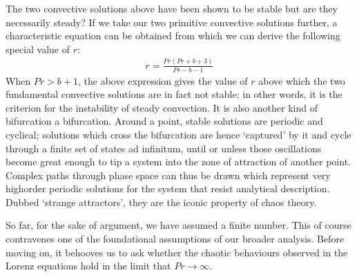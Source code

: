 \documentclass[letterpaper,10pt,english]{jupyterBook}
\begin{document}
\sphinxAtStartPar
The two convective solutions above have been shown to be stable \sphinxhyphen{} but are they necessarily steady? If we take our two primitive convective solutions further, a characteristic equation can be obtained from which we can derive the following special value of \(r\):
\begin{equation*}
\begin{split} r = \frac{Pr \left( Pr + b + 3 \right)}{Pr - b - 1} \end{split}
\end{equation*}
\sphinxAtStartPar
When \(Pr>b+1\), the above expression gives the value of \(r\) above which the two fundamental convective solutions are in fact not stable; in other words, it is the criterion for the instability of steady convection. It is also another kind of bifurcation \sphinxhyphen{} a  bifurcation. Around a  point, stable solutions are periodic and cyclical; solutions which cross the bifurcation are hence ‘captured’ by it and cycle through a finite set of states ad infinitum, until or unless those oscillations become great enough to tip a system into the zone of attraction of another  point. Complex paths through phase space can thus be drawn which represent very high\sphinxhyphen{}order periodic solutions for the system that resist analytical description. Dubbed ‘strange attractors’, they are the iconic property of chaos theory.

\sphinxAtStartPar
So far, for the sake of argument, we have assumed a finite  number. This of course contravenes one of the foundational assumptions of our broader analysis. Before moving on, it behooves us to ask whether the chaotic behaviours observed in the Lorenz equations hold in the limit that \(Pr\to\infty\).
\end{document}
